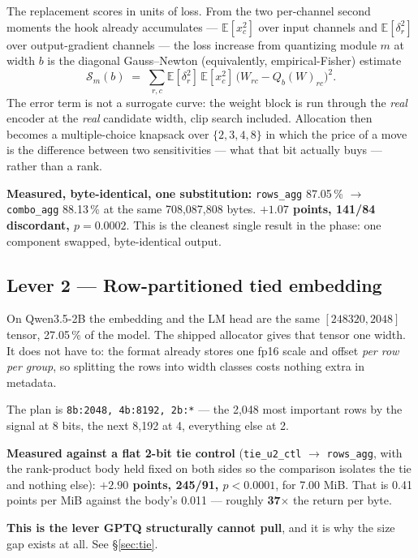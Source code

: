 \documentclass[11pt]{article}
\newcommand{\x}{\texorpdfstring{$\times$}{x}}
\newcommand{\pct}{\,\%}
\newcommand{\code}[1]{\texttt{#1}}
\newcommand{\best}[1]{\textbf{#1}}
\begin{document}
The replacement scores in units of loss. From the two per-channel second moments the hook already
accumulates --- $\mathbb{E}[x_c^2]$ over input channels and $\mathbb{E}[\delta_r^2]$ over
output-gradient channels --- the loss increase from quantizing module $m$ at width $b$ is the
diagonal Gauss--Newton (equivalently, empirical-Fisher) estimate
\begin{equation}
\mathcal{S}_m(b) \;=\; \sum_{r,c} \mathbb{E}[\delta_r^2]\,\mathbb{E}[x_c^2]\,
\bigl(W_{rc} - Q_b(W)_{rc}\bigr)^2 .
\label{eq:sens}
\end{equation}
The error term is not a surrogate curve: the weight block is run through the \emph{real} encoder
at the \emph{real} candidate width, clip search included. Allocation then becomes a
multiple-choice knapsack over $\{2,3,4,8\}$ in which the price of a move is the difference between
two sensitivities --- what that bit actually buys --- rather than a rank.

\textbf{Measured, byte-identical, one substitution:} \code{rows\_agg} 87.05\pct{} $\to$
\code{combo\_agg} 88.13\pct{} at the same 708{,}087{,}808 bytes. \best{$+1.07$ points, 141/84
discordant, $p = 0.0002$}. This is the cleanest single result in the phase: one component swapped,
byte-identical output.

\subsection{Lever 2 --- Row-partitioned tied embedding}

On Qwen3.5-2B the embedding and the LM head are the same $[248320, 2048]$ tensor, 27.05\pct{} of
the model. The shipped allocator gives that tensor one width. It does not have to: the format
already stores one fp16 scale and offset \emph{per row per group}, so splitting the rows into
width classes costs nothing extra in metadata.

The plan is \code{8b:2048, 4b:8192, 2b:*} --- the 2{,}048 most important rows by the signal at 8
bits, the next 8{,}192 at 4, everything else at 2.

\textbf{Measured against a flat 2-bit tie control} (\code{tie\_u2\_ctl} $\to$ \code{rows\_agg},
with the rank-product body held fixed on both sides so the comparison isolates the tie and
nothing else): \best{$+2.90$ points, 245/91, $p < 0.0001$}, for 7.00 MiB. That is 0.41 points per
MiB against the body's 0.011 --- roughly \textbf{37\x} the return per byte.

\textbf{This is the lever GPTQ structurally cannot pull}, and it is why the size gap exists at all.
See \S\ref{sec:tie}.
\end{document}
